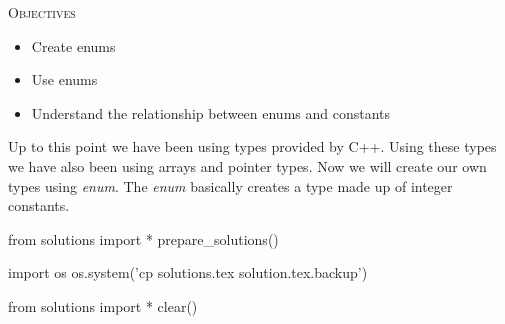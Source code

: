 
\textsc{Objectives}
\begin{itemize}
\item Create enums
\item Use enums
\item Understand the relationship between enums and constants
\end{itemize}

Up to this point we have been using types provided by C++. Using these
types we have also been using arrays and pointer types. Now we will
create our own types using \textit{enum}. The \textit{enum} basically
creates a type made up of integer constants.









\begin{python0}
from solutions import *
prepare_solutions()
\end{python0}
\begin{python}
import os
os.system('cp solutions.tex solution.tex.backup')  
\end{python}

\begin{python0}
from solutions import *
clear()
\end{python0}
